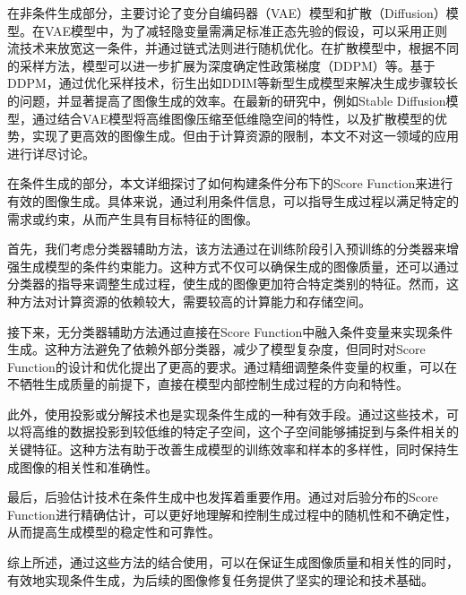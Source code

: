 在非条件生成部分，主要讨论了变分自编码器（VAE）模型和扩散（Diffusion）模型。在VAE模型中，为了减轻隐变量需满足标准正态先验的假设，可以采用正则流技术来放宽这一条件，并通过链式法则进行随机优化。在扩散模型中，根据不同的采样方法，模型可以进一步扩展为深度确定性政策梯度（DDPM）等。基于DDPM，通过优化采样技术，衍生出如DDIM等新型生成模型来解决生成步骤较长的问题，并显著提高了图像生成的效率。在最新的研究中，例如Stable Diffusion模型，通过结合VAE模型将高维图像压缩至低维隐空间的特性，以及扩散模型的优势，实现了更高效的图像生成。但由于计算资源的限制，本文不对这一领域的应用进行详尽讨论。

在条件生成的部分，本文详细探讨了如何构建条件分布下的Score Function来进行有效的图像生成。具体来说，通过利用条件信息，可以指导生成过程以满足特定的需求或约束，从而产生具有目标特征的图像。

首先，我们考虑分类器辅助方法，该方法通过在训练阶段引入预训练的分类器来增强生成模型的条件约束能力。这种方式不仅可以确保生成的图像质量，还可以通过分类器的指导来调整生成过程，使生成的图像更加符合特定类别的特征。然而，这种方法对计算资源的依赖较大，需要较高的计算能力和存储空间。

接下来，无分类器辅助方法通过直接在Score Function中融入条件变量来实现条件生成。这种方法避免了依赖外部分类器，减少了模型复杂度，但同时对Score Function的设计和优化提出了更高的要求。通过精细调整条件变量的权重，可以在不牺牲生成质量的前提下，直接在模型内部控制生成过程的方向和特性。

此外，使用投影或分解技术也是实现条件生成的一种有效手段。通过这些技术，可以将高维的数据投影到较低维的特定子空间，这个子空间能够捕捉到与条件相关的关键特征。这种方法有助于改善生成模型的训练效率和样本的多样性，同时保持生成图像的相关性和准确性。

最后，后验估计技术在条件生成中也发挥着重要作用。通过对后验分布的Score Function进行精确估计，可以更好地理解和控制生成过程中的随机性和不确定性，从而提高生成模型的稳定性和可靠性。

综上所述，通过这些方法的结合使用，可以在保证生成图像质量和相关性的同时，有效地实现条件生成，为后续的图像修复任务提供了坚实的理论和技术基础。



